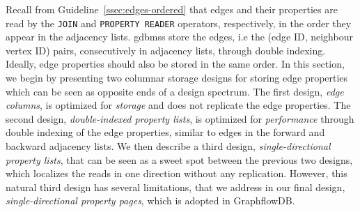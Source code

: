 Recall from Guideline~\ref{ssec:edges-ordered} that edges and their properties are read by the \texttt{JOIN} and \texttt{PROPERTY READER} operators, respectively, in the order they appear in the adjacency lists. \gls{gdbms}s store the edges, i.e the (edge ID, neighbour vertex ID) pairs, consecutively in adjacency lists, through double indexing. Ideally, edge properties should also be stored in the same order. In this section, we begin by presenting two columnar storage designs for storing edge properties which can be seen as opposite ends of a design spectrum. The first design, {\em edge columns}, is optimized for \emph{storage} and does not replicate the edge properties. The second design, {\em double-indexed property lists}, is optimized for \emph{performance} through double indexing of the edge properties, similar to edges in the forward and backward adjacency lists. We then describe a third design, {\em single-directional property lists}, that can be seen as a sweet spot between the previous two designs, which localizes the reads in one direction without any replication. However, this natural third design has several limitations, that we address in our final design, {\em single-directional property pages}, which is adopted in GraphflowDB. 

